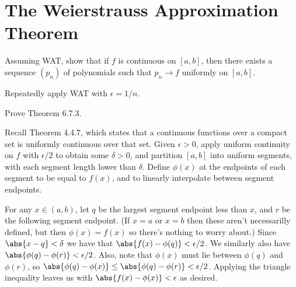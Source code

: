 \section{The Weierstrauss Approximation Theorem}

\begin{exercise}
Assuming WAT, show that if \(f\) is continuous on \([a, b]\), then there exists a sequence \((p_n)\) of polynomials such that \(p_n \to f\) uniformly on \([a, b]\).
\end{exercise}
\begin{solution}
Repeatedly apply WAT with \(\epsilon = 1/n\).
\end{solution}

\begin{exercise}
Prove Theorem 6.7.3.
\end{exercise}
\begin{solution}
Recall Theorem 4.4.7, which states that a continuous functions over a compact set is uniformly continuous over that set. Given \(\epsilon > 0\), apply uniform continuity on \(f\) with \(\epsilon/2\) to obtain some \(\delta > 0\), and partition \([a,b]\) into uniform segments, with each segment length lower than \(\delta\). Define \(\phi(x)\) at the endpoints of each segment to be equal to \(f(x)\), and to linearly interpolate between segment endpoints.

For any \(x \in (a, b)\), let \(q\) be the largest segment endpoint less than \(x\), and \(r\) be the following segment endpoint. (If \(x = a\) or \(x = b\) then these aren't necessarilly defined, but then \(\phi(x) = f(x)\) so there's nothing to worry about.) Since \(\abs{x-q} < \delta\) we have that \(\abs{f(x) - \phi(q)} < \epsilon/2\). We similarly also have \(\abs{\phi(q) - \phi(r)} < \epsilon/2\). Also, note that \(\phi(x)\) must lie between \(\phi(q)\) and \(\phi(r)\), so \(\abs{\phi(q) - \phi(x)} \leq \abs{\phi(q) - \phi(r)} < \epsilon/2\). Applying the triangle inequality leaves us with \(\abs{f(x) - \phi(x)}< \epsilon\) as desired.
\end{solution}

\begin{exercise}
\end{exercise}
\begin{solution}
\end{solution}

